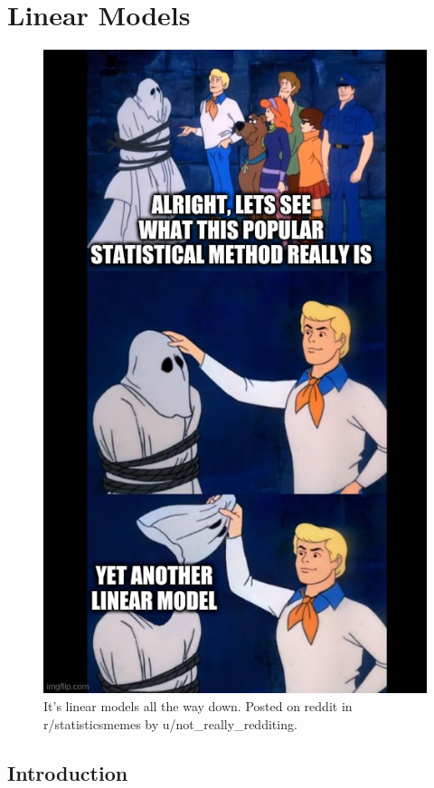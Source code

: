 \documentclass[
]{book}
\begin{document}
\hypertarget{linear}{%
\chapter{Linear Models}\label{linear}}

\begin{figure}
\centering
\includegraphics{images/scooby_doo_meme.jpg}
\caption{It's linear models all the way down. Posted on reddit in r/statisticsmemes by u/not\_really\_redditing.}
\end{figure}

\hypertarget{introduction}{%
\section{Introduction}\label{introduction}}
\end{document}
